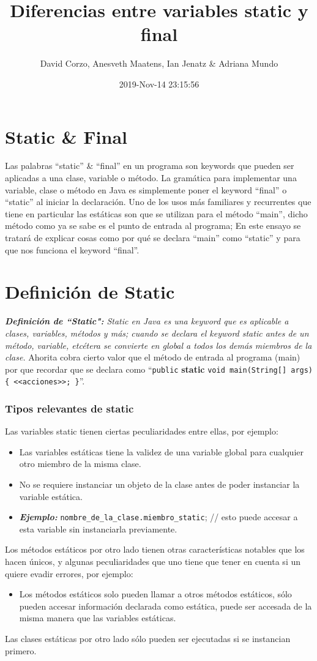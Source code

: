 \documentclass{article}
\title{Diferencias entre variables static y final}
\author{David Corzo, Anesveth Maatens, Ian Jenatz \& Adriana Mundo}
\date{2019-Nov-14 23:15:56}
\begin{document}
\maketitle

\section{Static \& Final}
Las palabras ``static'' \& ``final'' en un programa son keywords que pueden ser aplicadas a una clase, variable o método. La gramática para implementar una variable, clase o método en Java es simplemente poner el keyword ``final'' o ``static'' al iniciar la declaración. Uno de los usos más familiares y recurrentes que tiene en particular las estáticas son que se utilizan para el método ``main'', dicho método como ya se sabe es el punto de entrada al programa; En este ensayo se tratará de explicar cosas como por qué se declara ``main'' como ``static'' y para que nos funciona el keyword ``final''.

\section{Definición de Static}
\emph{\textbf{Definición de ``Static":} Static en Java es una keyword que es aplicable a clases, variables, métodos y más; cuando se declara el keyword static antes de un método, variable, etcétera se convierte en global a todos los demás miembros de la clase.} Ahorita cobra cierto valor que el método de entrada al programa (main) por que recordar que se declara como ``\verb|public| \textbf{static} \verb|void main(String[] args) { <<acciones>>; }|''.

\subsubsection{Tipos relevantes de static}
Las variables static tienen ciertas peculiaridades entre ellas, por ejemplo:
    \begin{itemize}
        \item Las variables estáticas tiene la validez de una variable global para cualquier otro miembro de la misma clase.
        \item No se requiere instanciar un objeto de la clase antes de poder instanciar la variable estática.
        \item \emph{\textbf{Ejemplo: }}\verb|nombre_de_la_clase.miembro_static|; // esto puede accesar a esta variable sin instanciarla previamente.  
    \end{itemize}
Los métodos estáticos por otro lado tienen otras características notables que los hacen únicos, y algunas peculiaridades que uno tiene que tener en cuenta si un quiere evadir errores, por ejemplo:
    \begin{itemize}
        \item Los métodos estáticos solo pueden llamar a otros métodos estáticos, sólo pueden accesar información declarada como estática, puede ser accesada de la misma manera que las variables estáticas.
    \end{itemize}

Las clases estáticas por otro lado sólo pueden ser ejecutadas si se instancian primero. \newline 


\section{}
\end{document}
